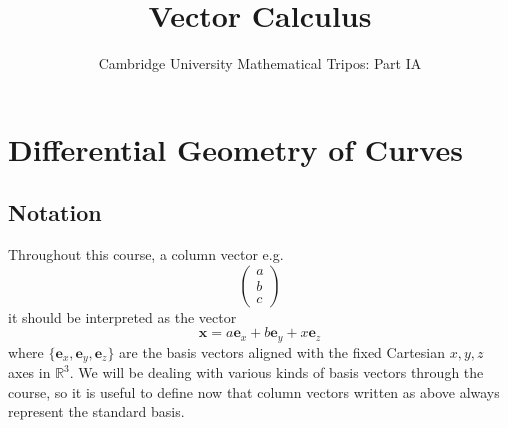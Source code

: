 \documentclass{article}
\title{Vector Calculus}
\author{Cambridge University Mathematical Tripos: Part IA}
\begin{document}
\maketitle

\tableofcontents
\newpage

\section{Differential Geometry of Curves}
\subsection{Notation}
Throughout this course, a column vector e.g.
\[ \begin{pmatrix}
        a \\ b \\ c
    \end{pmatrix} \]
it should be interpreted as the vector
\[ \bm x = a \bm e_x + b \bm e_y + x \bm e_z \]
where $\{ \bm e_x, \bm e_y, \bm e_z \}$ are the basis vectors aligned with the fixed Cartesian $x, y, z$ axes in $\mathbb R^3$. We will be dealing with various kinds of basis vectors through the course, so it is useful to define now that column vectors written as above always represent the standard basis.
\end{document}
